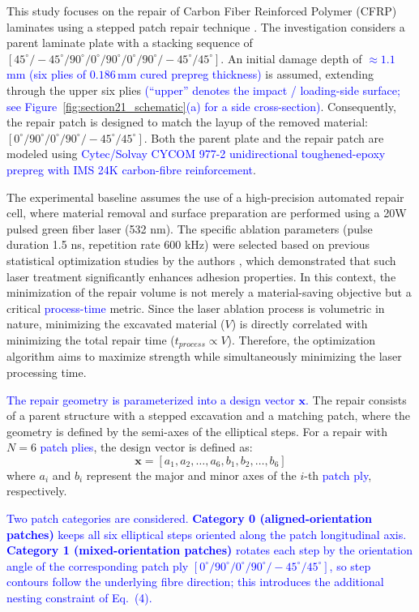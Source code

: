 \documentclass[
  preprint,
  12pt,
  a4paper
]{elsarticle}
\newcommand{\new}[1]{\textcolor{blue}{#1}}
\begin{document}
This study focuses on the repair of Carbon Fiber Reinforced Polymer (CFRP) laminates using a stepped patch repair technique \cite{psarras2024design}. The investigation considers a parent laminate plate with a stacking sequence of $[45^\circ/-45^\circ/90^\circ/0^\circ/90^\circ/0^\circ/90^\circ/-45^\circ/45^\circ]$. An initial damage depth of \new{$\approx 1.1$\,mm (six plies of $0.186$\,mm cured prepreg thickness)} is assumed, extending through the upper six plies \new{(``upper'' denotes the impact / loading-side surface; see Figure~\ref{fig:section21_schematic}(a) for a side cross-section)}. Consequently, the repair patch is designed to match the layup of the removed material: $[0^\circ/90^\circ/0^\circ/90^\circ/-45^\circ/45^\circ]$. Both the parent plate and the repair patch are modeled using \new{Cytec/Solvay CYCOM 977-2 unidirectional toughened-epoxy prepreg with IMS 24K carbon-fibre reinforcement}.

The experimental baseline assumes the use of a high-precision automated repair cell, where material removal and surface preparation are performed using a 20W pulsed green fiber laser (532 nm). The specific ablation parameters (pulse duration 1.5 ns, repetition rate 600 kHz) were selected based on previous statistical optimization studies by the authors \cite{psarras2020evaluating}, which demonstrated that such laser treatment significantly enhances adhesion properties. In this context, the minimization of the repair volume is not merely a material-saving objective but a critical \new{process-time} metric. Since the laser ablation process is volumetric in nature, minimizing the excavated material ($V$) is directly correlated with minimizing the total repair time ($t_{process} \propto V$). Therefore, the optimization algorithm aims to maximize strength while simultaneously minimizing the laser processing time.

\new{The repair geometry is parameterized into a design vector $\mathbf{x}$.} The repair consists of a parent structure with a stepped excavation and a matching patch, where the geometry is defined by the semi-axes of the elliptical steps. For a repair with $N=6$ \new{patch plies}, the design vector is defined as:
\begin{equation}
    \mathbf{x} = [a_1, a_2, \dots, a_6, b_1, b_2, \dots, b_6]
\end{equation}
where $a_i$ and $b_i$ represent the major and minor axes of the $i$-th \new{patch ply}, respectively.

\new{Two patch categories are considered. \textbf{Category 0 (aligned-orientation patches)} keeps all six elliptical steps oriented along the patch longitudinal axis. \textbf{Category 1 (mixed-orientation patches)} rotates each step by the orientation angle of the corresponding patch ply $[0^\circ/90^\circ/0^\circ/90^\circ/-45^\circ/45^\circ]$, so step contours follow the underlying fibre direction; this introduces the additional nesting constraint of Eq.~(4).}
\end{document}

